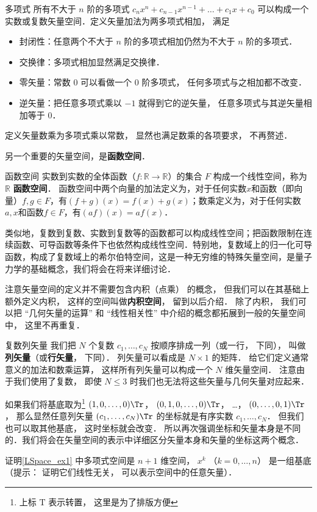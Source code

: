 \begin{example}{多项式}\label{LSpace_ex1}
所有不大于 $n$ 阶的多项式 $c_n x^n + c_{n-1} x^{n-1} + \dots + c_1 x + c_0$ 可以构成一个实数或复数矢量空间．定义矢量加法为两多项式相加， 满足
\begin{itemize}
\item 封闭性：任意两个不大于 $n$ 阶的多项式相加仍然为不大于 $n$ 阶的多项式．
\item 交换律：多项式相加显然满足交换律．
\item 零矢量：常数 0 可以看做一个 0 阶多项式， 任何多项式与之相加都不改变．
\item 逆矢量：把任意多项式乘以 $-1$ 就得到它的逆矢量， 任意多项式与其逆矢量相加等于 0．
\end{itemize}
定义矢量数乘为多项式乘以常数， 显然也满足数乘的各项要求， 不再赘述．
\end{example}

另一个重要的矢量空间，是\textbf{函数空间}．

\begin{example}{函数空间}\label{LSpace_ex2}
实数到实数的全体函数（$f:\mathbb R \to \mathbb R$）的集合 $F$ 构成一个线性空间，称为 $\mathbb{R}$ \textbf{函数空间}． 函数空间中两个向量的加法定义为，对于任何实数$x$和函数（即向量）$f, g\in F$，有$(f+g)(x)=f(x)+g(x)$；数乘定义为，对于任何实数$a, x$和函数$f\in F$，有$(af)(x)=af(x)$．

类似地，复数到复数、实数到复数等的函数都可以构成线性空间；把函数限制在连续函数、可导函数等条件下也依然构成线性空间．特别地，复数域上的归一化可导函数，构成了复数域上的希尔伯特空间，这是一种无穷维的特殊矢量空间，是量子力学的基础概念，我们将会在将来详细讨论．
\end{example}

注意矢量空间的定义并不需要包含内积（点乘） 的概念， 但我们可以在其基础上额外定义内积， 这样的空间叫做\textbf{内积空间}， 留到以后介绍． 除了内积， 我们可以把 “几何矢量的运算” 和 “线性相关性” 中介绍的概念都拓展到一般的矢量空间中， 这里不再重复．

\begin{exercise}{复数列矢量}
我们把 $N$ 个复数 $c_1, \dots, c_N$ 按顺序排成一列（或一行， 下同）， 叫做\textbf{列矢量}（或\textbf{行矢量}， 下同）． 列矢量可以看成是 $N \times 1$ 的矩阵． 给它们定义通常意义的加法和数乘运算， 这样所有列矢量可以构成一个 $N$ 维矢量空间． 注意由于我们使用了复数， 即使 $N \leqslant 3$ 时我们也无法将这些矢量与几何矢量对应起来．

如果我们将基底取为\footnote{上标 $\mathrm T$ 表示转置， 这里是为了排版方便} $(1, 0, \dots, 0)\Tr$， $(0, 1, 0, \dots, 0)\Tr$， …， $(0, \dots, 0, 1)\Tr$， 那么显然任意列矢量 $(c_1, \dots, c_N)\Tr$ 的坐标就是有序实数 $c_1, \dots, c_N$． 但我们也可以取其他基底， 这时坐标就会改变． 所以再次强调坐标和矢量本身是不同的．我们将会在矢量空间的表示中详细区分矢量本身和矢量的坐标这两个概念．
\end{exercise}

\begin{exercise}{}
证明\autoref{LSpace_ex1} 中多项式空间是 $n+1$ 维空间， $x^k$ （$k = 0, \dots, n$） 是一组基底（提示： 证明它们线性无关， 可以表示空间中的任意矢量）．
\end{exercise}





